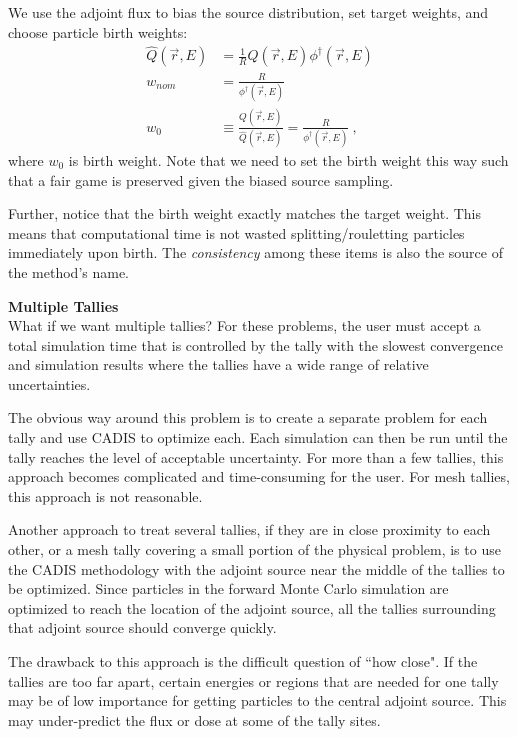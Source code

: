 \documentclass[12pt]{article}
\begin{document}
We use the adjoint flux to bias the source distribution, set target weights,
and choose particle birth weights:
\begin{align*}
\hat{Q}(\vec{r}, E) &= \frac{1}{R} Q(\vec{r}, E)\phi^{\dagger}(\vec{r}, E) \\
w_{nom} &= \frac{R}{\phi^{\dagger}(\vec{r}, E)}\\
w_0 &\equiv \frac{Q(\vec{r}, E)}{\hat{Q}(\vec{r}, E)} = \frac{R}{\phi^{\dagger}(\vec{r}, E)}\:,
\end{align*}
%
where $w_0$ is birth weight. Note that we need to set the birth weight this way
such that a fair game is preserved given the biased source sampling.

Further, notice that the birth weight exactly matches the target weight. This
means that computational time is not wasted splitting/rouletting particles 
immediately upon birth. The \textit{consistency} among these items is also the
source of the method's name.

\textbf{Multiple Tallies}\\
What if we want multiple tallies? For these problems, the user must accept a
total simulation time that is controlled by the tally with the slowest
convergence and simulation results where the tallies have a wide range of
relative uncertainties.

The obvious way around this problem is to create a separate problem for each
tally and use CADIS to optimize each. Each simulation can then be run until the
tally reaches the level of acceptable uncertainty. For more than a few tallies,
this approach becomes complicated and time-consuming for the user. For mesh tallies,
this approach is not reasonable.

Another approach to treat several tallies, if they are in close proximity to
each other, or a mesh tally covering a small portion of the physical problem,
is to use the CADIS methodology with the adjoint source near the middle of the
tallies to be optimized. Since particles in the forward Monte Carlo simulation
are optimized to reach the location of the adjoint source, all the tallies
surrounding that adjoint source should converge quickly.

The drawback to this approach is the difficult question of ``how close". If the
tallies are too far apart, certain energies or regions that are needed for one
tally may be of low importance for getting particles to the central adjoint
source. This may under-predict the flux or dose at some of the tally sites.
\end{document}
